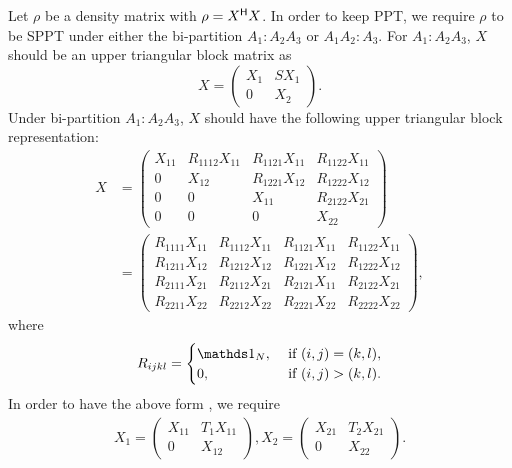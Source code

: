 Let $\rho$ be a density matrix with $\rho = X^{\mathsf{H}}X$. In order to keep PPT, we require $\rho$ to be SPPT under either
the  bi-partition $A_1:A_2A_3$ or $A_1A_2:A_3$. For $A_1:A_2A_3$,  $X$ should be an upper triangular block matrix as
\begin{equation}
  \label{eq:15}
  X =
  \begin{pmatrix}
    X_1 & SX_1\\
    0 & X_2
  \end{pmatrix}.
\end{equation}
Under bi-partition $A_1:A_2A_3$, $X$ should have the following  upper triangular block representation:
\begin{equation*}
  \begin{split}
    X&=
    \begin{pmatrix}
      X_{11} & R_{1112}X_{11} & R_ {1121}X_{11} & R_{1122}X_{11} \\
 0 &X_{12} & R_ {1221}X_{12} & R_{1222}X_{12} \\
  0 & 0 & X_{11} & R_{2122}X_{21} \\
 0 & 0 &0 & X_{22}
\end{pmatrix}\\
&=
    \begin{pmatrix}
  R_{1111}X_{11} & R_{1112}X_{11} & R_ {1121}X_{11} & R_{1122}X_{11} \\
  R_{1211}X_{12} & R_{1212}X_{12} & R_ {1221}X_{12} & R_{1222}X_{12} \\
  R_{2111}X_{21} & R_{2112}X_{21} & R_ {2121}X_{11} & R_{2122}X_{21} \\
  R_{2211}X_{22} & R_{2212}X_{22} & R_ {2221}X_{22} & R_{2222}X_{22}
\end{pmatrix},
\end{split}
\end{equation*}
where
\begin{equation*}
  \label{multiSPPTfinal2:eq:2}
  R_{ijkl} =
  \begin{cases}
    \I_N, &\text{ if }(i,j) = (k,l),\\
    0,& \text{ if }(i,j)>(k,l).
  \end{cases}
\end{equation*}
In order to have the above form , we require
\begin{align*}
  X_1 =
  \begin{pmatrix}
    X_{11} & T_1 X_{11}\\
    0 & X_{12}
  \end{pmatrix}, X_2 =
        \begin{pmatrix}
          X_{21} & T_{2} X_{21}\\
          0 & X_{22}
        \end{pmatrix}.
\end{align*}
